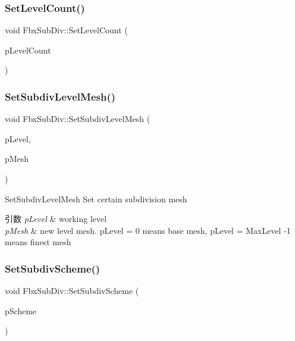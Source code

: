 \mbox{\label{class_fbx_sub_div_a6ddec560144de0e8cc18ebf4c56ede8a}} 
\subsubsection{\texorpdfstring{Set\+Level\+Count()}{SetLevelCount()}}
{\footnotesize\ttfamily void Fbx\+Sub\+Div\+::\+Set\+Level\+Count (\begin{DoxyParamCaption}\item[{int}]{p\+Level\+Count }\end{DoxyParamCaption})}

\mbox{\label{class_fbx_sub_div_a6185a554b2c8f5718631a62a8f6656b8}} 
\subsubsection{\texorpdfstring{Set\+Subdiv\+Level\+Mesh()}{SetSubdivLevelMesh()}}
{\footnotesize\ttfamily void Fbx\+Sub\+Div\+::\+Set\+Subdiv\+Level\+Mesh (\begin{DoxyParamCaption}\item[{int}]{p\+Level,  }\item[{\hyperlink{class_fbx_mesh}{Fbx\+Mesh} $\ast$}]{p\+Mesh }\end{DoxyParamCaption})}

Set\+Subdiv\+Level\+Mesh Set certain subdivision mesh 
\begin{DoxyParams}{引数}
{\em p\+Level} & working level \\
\hline
{\em p\+Mesh} & new level mesh. p\+Level = 0 means base mesh, p\+Level = Max\+Level -\/1 means finest mesh \\
\hline
\end{DoxyParams}
\mbox{\label{class_fbx_sub_div_aca6fac923a222a2f0b2841e0138559c0}} 
\subsubsection{\texorpdfstring{Set\+Subdiv\+Scheme()}{SetSubdivScheme()}}
{\footnotesize\ttfamily void Fbx\+Sub\+Div\+::\+Set\+Subdiv\+Scheme (\begin{DoxyParamCaption}\item[{\hyperlink{class_fbx_sub_div_aecdd4fdebb20f2796363989eba8ee9f5}{Fbx\+Sub\+Div\+::\+E\+Scheme}}]{p\+Scheme }\end{DoxyParamCaption})}

